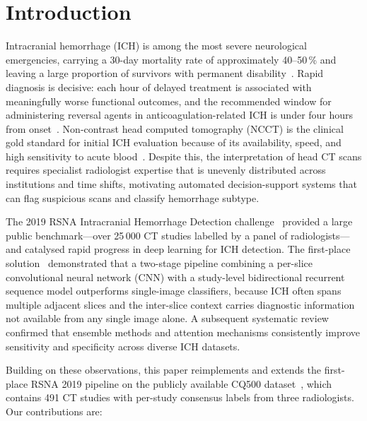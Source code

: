 \section{Introduction}
\label{sec:introduction}

Intracranial hemorrhage (ICH) is among the most severe neurological
emergencies, carrying a 30-day mortality rate of approximately
40--50\,\% and leaving a large proportion of survivors with permanent
disability~\cite{feigin2013global,lovelock2010incidence}.
Rapid diagnosis is decisive: each hour of delayed treatment is
associated with meaningfully worse functional outcomes, and the
recommended window for administering reversal agents in anticoagulation-related
ICH is under four hours from onset~\cite{hemphill2015ahaguideline}.
Non-contrast head computed tomography (NCCT) is the clinical gold standard
for initial ICH evaluation because of its availability, speed, and high
sensitivity to acute blood~\cite{broderick2007ich}.
Despite this, the interpretation of head CT scans requires specialist
radiologist expertise that is unevenly distributed across
institutions and time shifts, motivating automated decision-support systems
that can flag suspicious scans and classify hemorrhage subtype.

The 2019 RSNA Intracranial Hemorrhage Detection challenge~\cite{rsna2019}
provided a large public benchmark---over 25\,000 CT studies labelled by
a panel of radiologists---and catalysed rapid progress in deep learning for
ICH detection.
The first-place solution~\cite{wang2021deeplearning} demonstrated that a
two-stage pipeline combining a per-slice convolutional neural network (CNN)
with a study-level bidirectional recurrent sequence model outperforms
single-image classifiers, because ICH often spans multiple adjacent slices
and the inter-slice context carries diagnostic information not available from
any single image alone.
A subsequent systematic review~\cite{cho2021systematic} confirmed that
ensemble methods and attention mechanisms consistently improve sensitivity
and specificity across diverse ICH datasets.

Building on these observations, this paper reimplements and extends the
first-place RSNA 2019 pipeline on the publicly available CQ500
dataset~\cite{chilamkurthy2018cq500}, which contains 491 CT studies
with per-study consensus labels from three radiologists.
Our contributions are:

